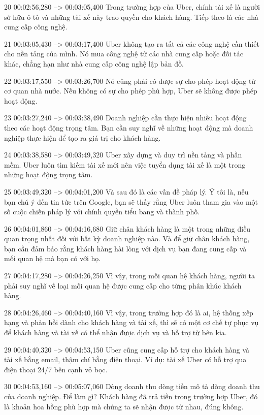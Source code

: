 20
00:02:56,280 --> 00:03:05,400
Trong trường hợp của Uber, chính tài xế là người sở hữu ô tô và những tài xế này trao quyền cho khách hàng.  Tiếp theo là các nhà cung cấp công nghệ.

21
00:03:05,430 --> 00:03:17,400
Uber không tạo ra tất cả các công nghệ cần thiết cho nền tảng của mình.  Nó mua công nghệ từ các nhà cung cấp hoặc đối tác khác, chẳng hạn như nhà cung cấp công nghệ lập bản đồ.

22
00:03:17,550 --> 00:03:26,700
Nó cũng phải có được sự cho phép hoạt động từ cơ quan nhà nước.  Nếu không có sự cho phép phù hợp, Uber sẽ không được phép hoạt động.

23
00:03:27,240 --> 00:03:38,490
Doanh nghiệp cần thực hiện nhiều hoạt động theo các hoạt động trọng tâm.  Bạn cần suy nghĩ về những hoạt động mà doanh nghiệp thực hiện để tạo ra giá trị cho khách hàng.

24
00:03:38,580 --> 00:03:49,320
Uber xây dựng và duy trì nền tảng và phần mềm.  Uber luôn tìm kiếm tài xế mới nên việc tuyển dụng tài xế là một trong những hoạt động trọng tâm.

25
00:03:49,320 --> 00:04:01,200
Và sau đó là các vấn đề pháp lý.  Ý tôi là, nếu bạn chú ý đến tin tức trên Google, bạn sẽ thấy rằng Uber luôn tham gia vào một số cuộc chiến pháp lý với chính quyền tiểu bang và thành phố.

26
00:04:01,860 --> 00:04:16,680
Giữ chân khách hàng là một trong những điều quan trọng nhất đối với bất kỳ doanh nghiệp nào.  Và để giữ chân khách hàng, bạn cần đảm bảo rằng khách hàng hài lòng với dịch vụ bạn đang cung cấp và mối quan hệ mà bạn có với họ.

27
00:04:17,280 --> 00:04:26,250
Vì vậy, trong mối quan hệ khách hàng, người ta phải suy nghĩ về loại mối quan hệ được cung cấp cho từng phân khúc khách hàng.

28
00:04:26,460 --> 00:04:40,160
Vì vậy, trong trường hợp đó là ai, hệ thống xếp hạng và phản hồi dành cho khách hàng và tài xế, thì sẽ có một cơ chế tự phục vụ để khách hàng và tài xế có thể nhận được dịch vụ và hỗ trợ từ bên kia.

29
00:04:40,320 --> 00:04:53,150
Uber cũng cung cấp hỗ trợ cho khách hàng và tài xế bằng email, thậm chí bằng điện thoại.  Ví dụ: tài xế Uber có hỗ trợ qua điện thoại 24/7 bên cạnh vỏ bọc.

30
00:04:53,160 --> 00:05:07,060
Dòng doanh thu dòng tiền mô tả dòng doanh thu của doanh nghiệp.  Để làm gì?  Khách hàng đã trả tiền trong trường hợp Uber, đó là khoản hoa hồng phù hợp mà chúng ta sẽ nhận được từ nhau, đúng không.


